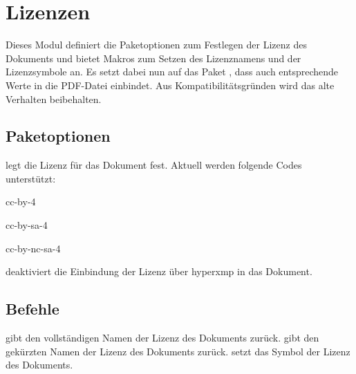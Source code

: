 \section{Lizenzen}
\label{modul:lizenzen}
Dieses Modul definiert die Paketoptionen zum Festlegen der Lizenz des
Dokuments und bietet Makros zum Setzen des Lizenznamens und der
Lizenzsymbole an. Es setzt dabei nun auf das Paket , dass auch entsprechende Werte in die PDF-Datei einbindet. Aus Kompatibilitätsgründen wird das alte Verhalten beibehalten.

\subsection{Paketoptionen}
\begin{options}
		legt die Lizenz für das Dokument fest. Aktuell werden
		folgende Codes unterstützt: \begin{smallitemize}
			\item cc-by-4
			\item cc-by-sa-4
			\item cc-by-nc-sa-4
		\end{smallitemize}
     deaktiviert die Einbindung der Lizenz über hyperxmp in das Dokument. 
\end{options}

\subsection{Befehle}
\begin{commands}
		gibt den vollständigen Namen der Lizenz des Dokuments zurück.
		gibt den gekürzten Namen der Lizenz des Dokuments zurück.
		setzt das Symbol der Lizenz des Dokuments.

\end{commands}
